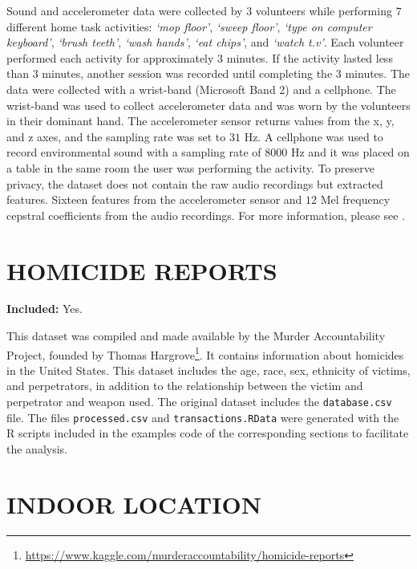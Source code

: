 \documentclass[
  11pt,
]{krantz}
\begin{document}
Sound and accelerometer data were collected by \(3\) volunteers while performing \(7\) different home task activities: \emph{`mop floor'}, \emph{`sweep floor'}, \emph{`type on computer keyboard'}, \emph{`brush teeth'}, \emph{`wash hands'}, \emph{`eat chips'}, and \emph{`watch t.v'}. Each volunteer performed each activity for approximately \(3\) minutes. If the activity lasted less than \(3\) minutes, another session was recorded until completing the \(3\) minutes. The data were collected with a wrist-band (Microsoft Band 2) and a cellphone. The wrist-band was used to collect accelerometer data and was worn by the volunteers in their dominant hand. The accelerometer sensor returns values from the x, y, and z axes, and the sampling rate was set to \(31\) Hz. A cellphone was used to record environmental sound with a sampling rate of \(8000\) Hz and it was placed on a table in the same room the user was performing the activity. To preserve privacy, the dataset does not contain the raw audio recordings but extracted features. Sixteen features from the accelerometer sensor and \(12\) Mel frequency cepstral coefficients from the audio recordings. For more information, please see \citet{garcia2018multiview}.

\hypertarget{homicide-reports}{%
\section{HOMICIDE REPORTS}\label{homicide-reports}}

\textbf{Included:} Yes.

This dataset was compiled and made available by the Murder Accountability Project, founded by Thomas Hargrove\footnote{\url{https://www.kaggle.com/murderaccountability/homicide-reports}}.
It contains information about homicides in the United States. This dataset includes the age, race, sex, ethnicity of victims, and perpetrators, in addition to the relationship between the victim and perpetrator and weapon used. The original dataset includes the \texttt{database.csv} file. The files \texttt{processed.csv} and \texttt{transactions.RData} were generated with the R scripts included in the examples code of the corresponding sections to facilitate the analysis.

\hypertarget{indoor-location}{%
\section{INDOOR LOCATION}\label{indoor-location}}
\end{document}
